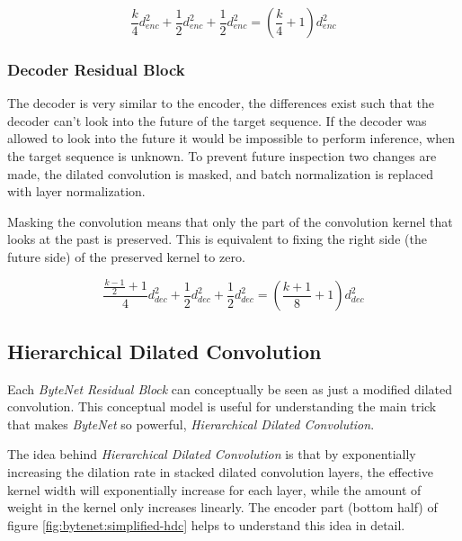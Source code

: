 \begin{equation}
\frac{k}{4} d_{enc}^2 + \frac{1}{2} d_{enc}^2 + \frac{1}{2} d_{enc}^2 = \left(\frac{k}{4} + 1\right) d_{enc}^2
\end{equation}


\subsubsection{Decoder Residual Block}

The decoder is very similar to the encoder, the differences exist such that the decoder can't look into the future of the target sequence. If the decoder was allowed to look into the future it would be impossible to perform inference, when the target sequence is unknown. To prevent future inspection two changes are made‚ the dilated convolution is masked, and batch normalization is replaced with layer normalization.

Masking the convolution means that only the part of the convolution kernel that looks at the past is preserved. This is equivalent to fixing the right side (the future side) of the preserved kernel to zero.


\begin{equation}
\frac{\frac{k-1}{2} + 1}{4} d_{dec}^2 + \frac{1}{2} d_{dec}^2 + \frac{1}{2} d_{dec}^2 = \left(\frac{k + 1}{8} + 1\right) d_{dec}^2
\end{equation}


\subsection{Hierarchical Dilated Convolution}
\label{sec:theory:bytenet:hierarchical-dilated-convolution}

Each \textit{ByteNet Residual Block} can conceptually be seen as just a modified dilated convolution. This conceptual model is useful for understanding the main trick that makes \textit{ByteNet} so powerful, \textit{Hierarchical Dilated Convolution}.

The idea behind \textit{Hierarchical Dilated Convolution} is that by exponentially increasing the dilation rate in stacked dilated convolution layers, the effective kernel width will exponentially increase for each layer, while the amount of weight in the kernel only increases linearly. The encoder part (bottom half) of figure \ref{fig:bytenet:simplified-hdc} helps to understand this idea in detail.

